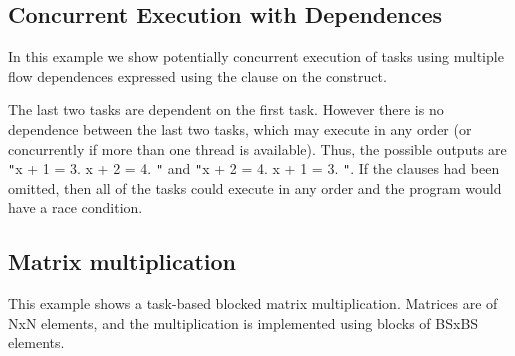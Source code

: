 \subsection{Concurrent Execution with Dependences}
\label{subsec:task_concurrent_depend}

In this example we show potentially concurrent execution of tasks using multiple 
flow dependences expressed using the  clause on the  
construct.



The last two tasks are dependent on the first task. However there is no dependence 
between the last two tasks, which may execute in any order (or concurrently if 
more than one thread is available). Thus, the possible outputs are \texttt{"}x 
+ 1 = 3. x + 2 = 4. \texttt{"} and \texttt{"}x + 2 = 4. x + 1 = 3. \texttt{"}. 
If the  clauses had been omitted, then all of the tasks could execute 
in any order and the program would have a race condition.

\subsection{Matrix multiplication}
\label{subsec:task_matrix_mult}

This example shows a task-based blocked matrix multiplication. Matrices are of 
NxN elements, and the multiplication is implemented using blocks of BSxBS elements.



